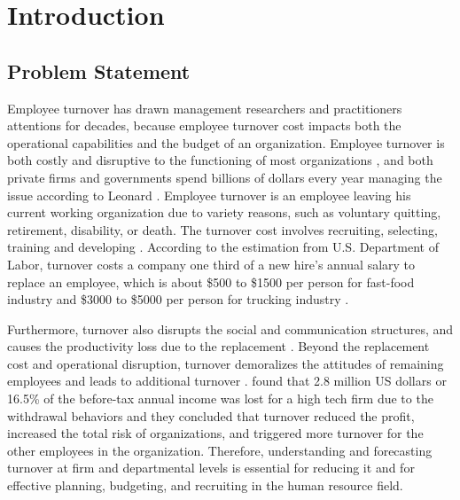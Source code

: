 \chapter{Introduction} \label{ch:introduction}
\section{Problem Statement}
Employee turnover has drawn management researchers and practitioners attentions for decades, because employee turnover cost impacts both the operational capabilities and the budget of an organization. Employee turnover is both costly and disruptive to the functioning of most organizations \citep{kacmar2006, mueller1989,staw1980}, and both private firms and governments spend billions of dollars every year managing the issue according to Leonard \citeyearpar{leonard2001}. %
Employee turnover is an employee leaving his current working organization due to variety reasons, such as voluntary quitting, retirement, disability, or death.
The turnover cost involves recruiting, selecting, training and developing \citep{mobley1982, staw1980}. According to the estimation from U.S. Department of Labor, turnover costs a company one third of a new hire's annual salary to %
replace an employee, which is about \$500 to \$1500 per person for fast-food industry and \$3000 to \$5000 per person for trucking industry \citep{white1995}. 

Furthermore, turnover also disrupts the social and communication structures, and causes the productivity loss due to the replacement \citep{mobley1982}. Beyond the replacement cost and operational disruption, turnover demoralizes the attitudes of remaining employees and leads to additional turnover \citep{staw1980}. \citet{sagie2002} found that 2.8 million US dollars or 16.5\% of the before-tax annual income was lost for a high tech firm due to the withdrawal behaviors and they concluded that turnover reduced the profit, increased the total risk of organizations, and triggered more turnover for the other employees in the organization. Therefore, understanding and forecasting turnover at firm and departmental levels is essential for reducing it \citep{kacmar2006} and for effective planning, budgeting, and recruiting in the human resource field. 

